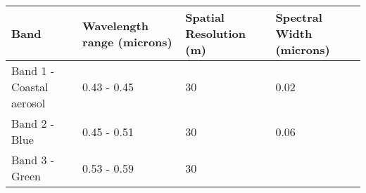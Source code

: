 \documentclass[]{book}
\begin{document}
\begin{longtable}[]{@{}llll@{}}
\toprule
\begin{minipage}[b]{0.36\columnwidth}\raggedright
Band\strut
\end{minipage} & \begin{minipage}[b]{0.18\columnwidth}\raggedright
Wavelength range (microns)\strut
\end{minipage} & \begin{minipage}[b]{0.19\columnwidth}\raggedright
Spatial Resolution (m)\strut
\end{minipage} & \begin{minipage}[b]{0.16\columnwidth}\raggedright
Spectral Width (microns)\strut
\end{minipage}\tabularnewline
\midrule
\endhead
\begin{minipage}[t]{0.36\columnwidth}\raggedright
Band 1 - Coastal aerosol\strut
\end{minipage} & \begin{minipage}[t]{0.18\columnwidth}\raggedright
0.43 - 0.45\strut
\end{minipage} & \begin{minipage}[t]{0.19\columnwidth}\raggedright
30\strut
\end{minipage} & \begin{minipage}[t]{0.16\columnwidth}\raggedright
0.02\strut
\end{minipage}\tabularnewline
\begin{minipage}[t]{0.36\columnwidth}\raggedright
Band 2 - Blue\strut
\end{minipage} & \begin{minipage}[t]{0.18\columnwidth}\raggedright
0.45 - 0.51\strut
\end{minipage} & \begin{minipage}[t]{0.19\columnwidth}\raggedright
30\strut
\end{minipage} & \begin{minipage}[t]{0.16\columnwidth}\raggedright
0.06\strut
\end{minipage}\tabularnewline
\begin{minipage}[t]{0.36\columnwidth}\raggedright
Band 3 - Green\strut
\end{minipage} & \begin{minipage}[t]{0.18\columnwidth}\raggedright
0.53 - 0.59\strut
\end{minipage} & \begin{minipage}[t]{0.19\columnwidth}\raggedright
30\strut
\end{minipage} & \begin{minipage}[t]{0.16\columnwidth}\raggedright

\end{minipage}
\end{longtable}
\end{document}
